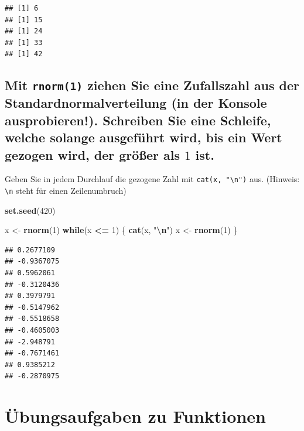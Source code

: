\documentclass[12pt,a4paper]{article}
\newenvironment{Shaded}{\begin{snugshade}}{\end{snugshade}}
\newcommand{\ControlFlowTok}[1]{\textcolor[rgb]{0.13,0.29,0.53}{\textbf{#1}}}
\newcommand{\DecValTok}[1]{\textcolor[rgb]{0.00,0.00,0.81}{#1}}
\newcommand{\FunctionTok}[1]{\textcolor[rgb]{0.13,0.29,0.53}{\textbf{#1}}}
\newcommand{\NormalTok}[1]{#1}
\newcommand{\OtherTok}[1]{\textcolor[rgb]{0.56,0.35,0.01}{#1}}
\newcommand{\SpecialCharTok}[1]{\textcolor[rgb]{0.81,0.36,0.00}{\textbf{#1}}}
\newcommand{\StringTok}[1]{\textcolor[rgb]{0.31,0.60,0.02}{#1}}
\begin{document}
\begin{verbatim}
## [1] 6
## [1] 15
## [1] 24
## [1] 33
## [1] 42
\end{verbatim}

\subsection{\texorpdfstring{Mit \texttt{rnorm(1)} ziehen Sie eine
Zufallszahl aus der Standardnormalverteilung (in der Konsole
ausprobieren!). Schreiben Sie eine Schleife, welche solange ausgeführt
wird, bis ein Wert gezogen wird, der größer als \(1\)
ist.}{Mit  ziehen Sie eine Zufallszahl aus der Standardnormalverteilung (in der Konsole ausprobieren!). Schreiben Sie eine Schleife, welche solange ausgeführt wird, bis ein Wert gezogen wird, der größer als 1 ist.}}\label{mit-ziehen-sie-eine-zufallszahl-aus-der-standardnormalverteilung-in-der-konsole-ausprobieren.-schreiben-sie-eine-schleife-welche-solange-ausgefuxfchrt-wird-bis-ein-wert-gezogen-wird-der-gruxf6uxdfer-als-1-ist.}

Geben Sie in jedem Durchlauf die gezogene Zahl mit
\texttt{cat(x,\ "\textbackslash{}n")} aus. (Hinweis:
\texttt{\textbackslash{}n} steht für einen Zeilenumbruch)

\begin{Shaded}
\begin{Highlighting}[]
    \FunctionTok{set.seed}\NormalTok{(}\DecValTok{420}\NormalTok{)}
    
\NormalTok{    x }\OtherTok{\textless{}{-}} \FunctionTok{rnorm}\NormalTok{(}\DecValTok{1}\NormalTok{)}
    \ControlFlowTok{while}\NormalTok{(x }\SpecialCharTok{\textless{}=} \DecValTok{1}\NormalTok{) \{}
      \FunctionTok{cat}\NormalTok{(x, }\StringTok{"}\SpecialCharTok{\textbackslash{}n}\StringTok{"}\NormalTok{)}
\NormalTok{      x }\OtherTok{\textless{}{-}} \FunctionTok{rnorm}\NormalTok{(}\DecValTok{1}\NormalTok{)}
\NormalTok{    \}}
\end{Highlighting}
\end{Shaded}

\begin{verbatim}
## 0.2677109 
## -0.9367075 
## 0.5962061 
## -0.3120436 
## 0.3979791 
## -0.5147962 
## -0.5518658 
## -0.4605003 
## -2.948791 
## -0.7671461 
## 0.9385212 
## -0.2870975
\end{verbatim}

\section{Übungsaufgaben zu
Funktionen}\label{uxfcbungsaufgaben-zu-funktionen}
\end{document}
